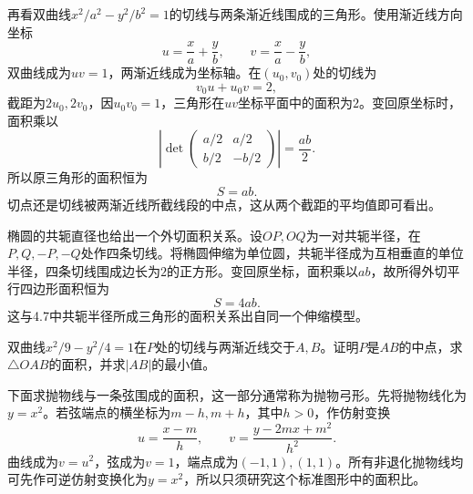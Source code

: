 再看双曲线\(x^2/a^2-y^2/b^2=1\)的切线与两条渐近线围成的三角形。使用渐近线方向坐标
\begin{equation*}
 u=\frac xa+\frac yb,\qquad v=\frac xa-\frac yb,
\end{equation*}
双曲线成为\(uv=1\)，两渐近线成为坐标轴。在\((u_0,v_0)\)处的切线为
\begin{equation*}
 v_0u+u_0v=2,
\end{equation*}
截距为\(2u_0,2v_0\)，因\(u_0v_0=1\)，三角形在\(uv\)坐标平面中的面积为\(2\)。变回原坐标时，面积乘以
\begin{equation*}
 \left|\det\begin{pmatrix}a/2&a/2\\b/2&-b/2\end{pmatrix}\right|=\frac{ab}{2}.
\end{equation*}
所以原三角形的面积恒为
\begin{equation}\label{eq:quadratic-hyperbola-tangent-triangle-area}
 S=ab.
\end{equation}
切点还是切线被两渐近线所截线段的中点，这从两个截距的平均值即可看出。

椭圆的共轭直径也给出一个外切面积关系。设\(OP,OQ\)为一对共轭半径，在\(P,Q,-P,-Q\)处作四条切线。将椭圆伸缩为单位圆，共轭半径成为互相垂直的单位半径，四条切线围成边长为\(2\)的正方形。变回原坐标，面积乘以\(ab\)，故所得外切平行四边形面积恒为
\begin{equation}\label{eq:quadratic-conjugate-tangent-parallelogram}
 S=4ab.
\end{equation}
这与4.7中共轭半径所成三角形的面积关系出自同一个伸缩模型。

\par\noindent\begin{minipage}{\linewidth}
\begin{example}
双曲线\(x^2/9-y^2/4=1\)在\(P\)处的切线与两渐近线交于\(A,B\)。证明\(P\)是\(AB\)的中点，求\(\triangle OAB\)的面积，并求\(|AB|\)的最小值。
\end{example}
\end{minipage}\par

下面求抛物线与一条弦围成的面积，这一部分通常称为{\heiti{}抛物弓形}。先将抛物线化为\(y=x^2\)。若弦端点的横坐标为\(m-h,m+h\)，其中\(h>0\)，作仿射变换
\begin{equation*}
 u=\frac{x-m}{h},\qquad
 v=\frac{y-2mx+m^2}{h^2}.
\end{equation*}
曲线成为\(v=u^2\)，弦成为\(v=1\)，端点成为\((-1,1),(1,1)\)。所有非退化抛物线均可先作可逆仿射变换化为\(y=x^2\)，所以只须研究这个标准图形中的面积比。

